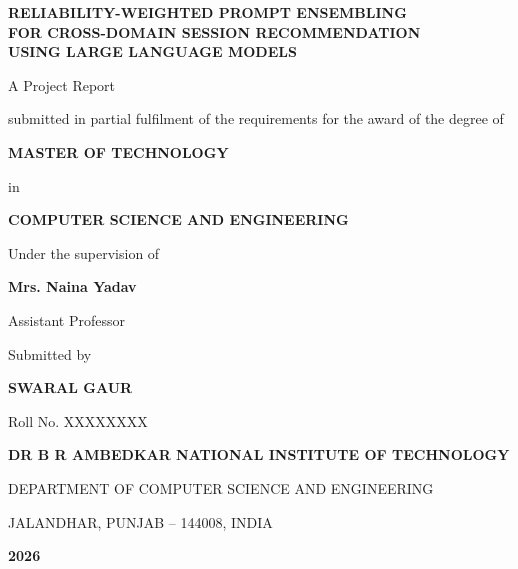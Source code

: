 \documentclass[12pt,a4paper,oneside]{report}
\newcommand{\myname}{SWARAL GAUR}
\newcommand{\myrollno}{XXXXXXXX}          %
\newcommand{\supervisorname}{Mrs. Naina Yadav}
\newcommand{\supervisordesignation}{Assistant Professor}  %
\begin{document}
\thispagestyle{empty}
\begin{center}
\vspace*{0.3in}
{\large\bfseries RELIABILITY-WEIGHTED PROMPT ENSEMBLING\\[4pt]
FOR CROSS-DOMAIN SESSION RECOMMENDATION\\[4pt]
USING LARGE LANGUAGE MODELS\par}

\vspace{0.5in}
{\normalsize A Project Report\par}
\vspace{6pt}
{\small submitted in partial fulfilment of the requirements for the award of the degree of\par}

\vspace{0.25in}
{\large\bfseries MASTER OF TECHNOLOGY\par}
\vspace{6pt}
{\normalsize in\par}
\vspace{6pt}
{\large\bfseries COMPUTER SCIENCE AND ENGINEERING\par}

\vspace{0.45in}
{\normalsize Under the supervision of\par}
\vspace{6pt}
{\large\bfseries \supervisorname\par}
{\normalsize \supervisordesignation\par}

\vspace{0.35in}
{\normalsize Submitted by\par}
\vspace{6pt}
{\large\bfseries \myname\par}
{\normalsize Roll No. \myrollno\par}

\vfill
{\normalsize\bfseries DR B R AMBEDKAR NATIONAL INSTITUTE OF TECHNOLOGY\par}
{\normalsize DEPARTMENT OF COMPUTER SCIENCE AND ENGINEERING\par}
{\normalsize JALANDHAR, PUNJAB -- 144008, INDIA\par}
\vspace{8pt}
{\normalsize\bfseries 2026\par}
\end{center}
\end{document}
